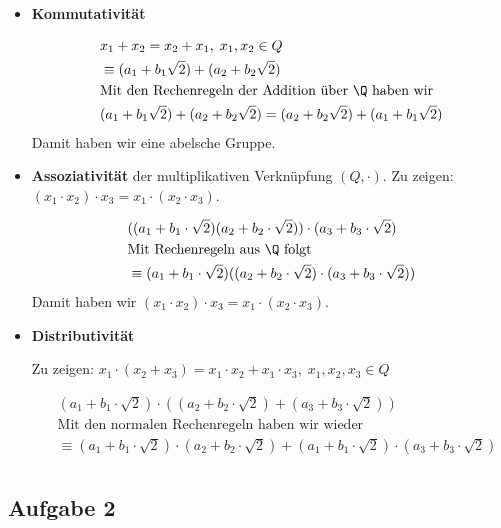 \begin{itemize}
 \item \textbf{Kommutativität}

  \begin{align*}
    &x_1 + x_2 = x_2 + x_1, \; x_1, x_2 \in Q \\
    &\equiv (a_1 + b_1 \sqrt{2}) + (a_2 + b_2 \sqrt{2})\\
    & \text{Mit den Rechenregeln der Addition über $\Q$ haben wir} \\
    & (a_1 + b_1 \sqrt{2}) + (a_2 + b_2 \sqrt{2}) = (a_2 + b_2 \sqrt{2}) + (a_1 + b_1 \sqrt{2}) \\
  \end{align*}
  Damit haben wir eine abelsche Gruppe.

  \item \textbf{Assoziativität} der multiplikativen Verknüpfung $(Q, \cdot)$. Zu zeigen: $(x_1 \cdot x_2) \cdot x_3 = x_1 \cdot (x_2 \cdot x_3)$.

  \begin{align*}
  &((a_1 + b_1 \cdot \sqrt{2}) (a_2 + b_2 \cdot \sqrt{2})) \cdot (a_3  + b_3 \cdot \sqrt{2}) \\
    &\text{Mit Rechenregeln aus $\Q$ folgt}\\
    &\equiv (a_1 + b_1 \cdot \sqrt{2}) ((a_2 + b_2 \cdot \sqrt{2}) \cdot (a_3  + b_3 \cdot \sqrt{2}))
  \end{align*}
  Damit haben wir $(x_1 \cdot x_2) \cdot x_3 = x_1 \cdot (x_2 \cdot x_3)$.
  \item \textbf{Distributivität}

  Zu zeigen: $  x_1 \cdot (x_2 + x_3) = x_1 \cdot x_2 + x_1 \cdot x_3 , \; x_1, x_2, x_3 \in Q $

  \begin{align*}
    &(a_1 + b_1 \cdot \sqrt{2}) \cdot ((a_2 + b_2 \cdot \sqrt{2})+(a_3 + b_3 \cdot \sqrt{2} )) \\
    &\text{Mit den normalen Rechenregeln haben wir wieder} \\
    &\equiv (a_1 + b_1\cdot\sqrt{2})\cdot(a_2 + b_2 \cdot \sqrt{2}) +
      (a_1 + b_1 \cdot \sqrt{2}) \cdot (a_3 + b_3 \cdot \sqrt{2})\\
  \end{align*}


\end{itemize}

\subsection*{Aufgabe 2}

